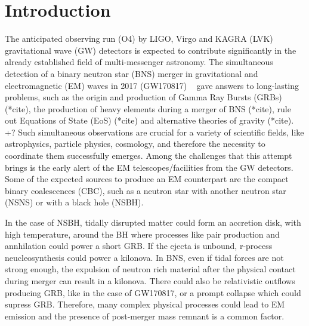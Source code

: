 \section{Introduction}

The anticipated observing run (O4) by LIGO, Virgo and KAGRA (LVK) gravitational wave (GW) detectors is expected to contribute significantly in the already established field of multi-messenger astronomy. The simultaneous detection of a binary neutron star (BNS) merger in gravitational and electromagnetic (EM) waves in 2017 (GW170817) ~\cite{LIGOScientific:2017ync} gave answers to long-lasting problems, such as the origin and production of Gamma Ray Bursts (GRBs) (*cite), the production of heavy elements during a merger of BNS (*cite), rule out Equations of State (EoS) (*cite) and alternative theories of gravity (*cite). +? Such simultaneous observations are crucial for a variety of scientific fields, like astrophysics, particle physics, cosmology, and therefore the necessity to coordinate them successfully emerges. Among the challenges that this attempt brings is the early alert of the EM telescopes/facilities from the GW detectors. Some of the expected sources to produce an EM counterpart are the compact binary coalescences (CBC), such as a neutron star with another neutron star (NSNS) or with a black hole (NSBH).

In the case of NSBH, tidally disrupted matter could form an accretion disk, with high temperature, around the BH where processes like pair production and annhilation could power a short GRB. If the ejecta is unbound, r-process neucleosynthesis could power a kilonova. In BNS, even if tidal forces are not strong enough, the expulsion of neutron rich material after the physical contact during merger can result in a kilonova. There could also be relativistic outflows producing GRB, like in the case of GW170817, or a prompt collapse which could supress GRB. Therefore, many complex physical processes could lead to EM emission and the presence of post-merger mass remnant is a common factor.


